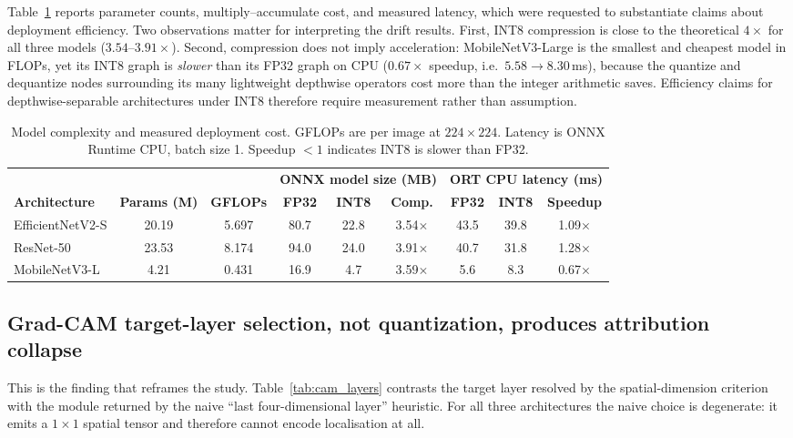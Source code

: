 \documentclass[fleqn,10pt]{wlscirep}
\begin{document}
Table~\ref{tab:efficiency} reports parameter counts, multiply--accumulate cost, and measured latency, which were requested to substantiate claims about deployment efficiency. Two observations matter for interpreting the drift results. First, INT8 compression is close to the theoretical $4\times$ for all three models ($3.54$--$3.91\times$). Second, compression does not imply acceleration: MobileNetV3-Large is the smallest and cheapest model in FLOPs, yet its INT8 graph is \emph{slower} than its FP32 graph on CPU ($0.67\times$ speedup, i.e.\ $5.58 \rightarrow 8.30$\,ms), because the quantize and dequantize nodes surrounding its many lightweight depthwise operators cost more than the integer arithmetic saves. Efficiency claims for depthwise-separable architectures under INT8 therefore require measurement rather than assumption.

\begin{table}[!ht]
\centering
\scriptsize
\caption{Model complexity and measured deployment cost. GFLOPs are per image at $224 \times 224$. Latency is ONNX Runtime CPU, batch size 1. Speedup ${<}1$ indicates INT8 is slower than FP32.}
\label{tab:efficiency}
\setlength{\tabcolsep}{4pt}
\begin{tabular}{lcc cc c cc c}
\toprule
 & & & \multicolumn{3}{c}{\textbf{ONNX model size (MB)}} & \multicolumn{3}{c}{\textbf{ORT CPU latency (ms)}} \\
\cmidrule(lr){4-6} \cmidrule(lr){7-9}
\textbf{Architecture} & \textbf{Params (M)} & \textbf{GFLOPs} & \textbf{FP32} & \textbf{INT8} & \textbf{Comp.} & \textbf{FP32} & \textbf{INT8} & \textbf{Speedup} \\
\midrule
EfficientNetV2-S & 20.19 & 5.697 & 80.7 & 22.8 & 3.54$\times$ & 43.5 & 39.8 & 1.09$\times$ \\
ResNet-50 & 23.53 & 8.174 & 94.0 & 24.0 & 3.91$\times$ & 40.7 & 31.8 & 1.28$\times$ \\
MobileNetV3-L & 4.21 & 0.431 & 16.9 & 4.7 & 3.59$\times$ & 5.6 & 8.3 & 0.67$\times$ \\
\bottomrule
\end{tabular}
\end{table}

\subsection*{Grad-CAM target-layer selection, not quantization, produces attribution collapse}

This is the finding that reframes the study. Table~\ref{tab:cam_layers} contrasts the target layer resolved by the spatial-dimension criterion with the module returned by the naive ``last four-dimensional layer'' heuristic. For all three architectures the naive choice is degenerate: it emits a $1 \times 1$ spatial tensor and therefore cannot encode localisation at all.
\end{document}
